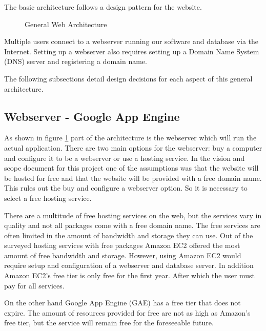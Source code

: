 \documentclass{article}
\begin{document}
The basic architecture follows a design pattern for the website.

\FloatBarrier
\begin{figure}[h!]
\caption{General Web Architecture}
\label{fig:generalWebArchitecture}
\end{figure}
\FloatBarrier

Multiple users connect to a webserver running our software and database via the Internet.
Setting up a webserver also requires setting up a Domain Name System (DNS) server and registering a domain
name.

The following subsections detail design decisions for each aspect of this general architecture.

\subsection{Webserver - Google App Engine}

As shown in figure \ref{fig:generalWebArchitecture} part of the architecture is the webserver which will run the actual application. There are two main options
for the webserver: buy a computer and configure it to be a webserver or use a hosting service. In the vision and scope document for this project
one of the assumptions was that the website will be hosted for free and that the website will be provided with a free
domain name. \cite{schwab_apo_2012} This rules out the buy and configure a webserver option. So it is necessary to select a free hosting service.

There are a multitude of free hosting services on the web, but the services vary in quality and not all packages
come with a free domain name. The free services are often limited in the amount of bandwidth and storage they can use.
Out of the surveyed hosting services with free packages Amazon EC2 offered the most amount of free bandwidth and storage. \cite{amazon_amazon_2012} \cite{heroku_heroku_2012} \cite{google_quotas_2012} However, using Amazon EC2 would require setup and configuration of a webserver and database server. In addition Amazon EC2's free tier is only free for the first year. After which the user must pay for all services.

On the other hand Google App Engine (GAE) has a free tier that does not expire. The amount of resources provided for free are not as high as Amazon's free tier, but the service will remain free for the foreseeable future.  \cite{google_quotas_2012} 
\end{document}
